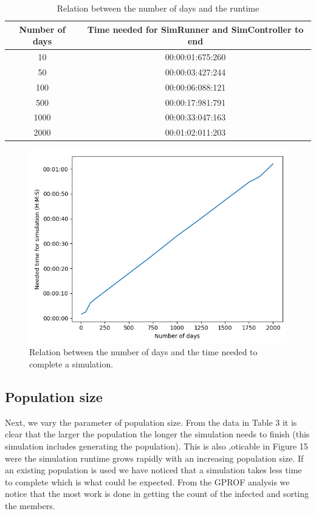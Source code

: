 \documentclass[runningheads]{llncs}
\begin{document}
\begin{table}
	\caption{Relation between the number of days and the runtime}
	\begin{center}
		\begin{tabular}{ | c | c |}
			\hline
			Number of days & Time needed for SimRunner and SimController to end \\ \hline
			10 & 00:00:01:675:260 \\ \hline
			50 & 00:00:03:427:244 \\ \hline
			100 & 00:00:06:088:121 \\ \hline
			500 & 00:00:17:981:791 \\ \hline
			1000 & 00:00:33:047:163 \\ \hline
			2000 & 00:01:02:011:203 \\
			\hline	
		\end{tabular}
	\end{center}
\end{table}
\newpage
\begin{figure}
	\includegraphics[scale=0.65]{performance_days.png}
	\caption{Relation between the number of days and the time needed to complete a simulation.} 
\end{figure}

\subsection{Population size}
Next, we vary the parameter of population size. From the data in Table 3 it is clear that the larger the population the longer the simulation needs to finish (this simulation includes generating the population). This is also ,oticable in Figure 15 were the simulation runtime grows rapidly with an increasing population size. If an existing population is used we have noticed that a simulation takes less time to complete which is what could be expected. From the GPROF analysis we notice that the most work is done in getting the count of the infected and sorting the members. \\
\end{document}
